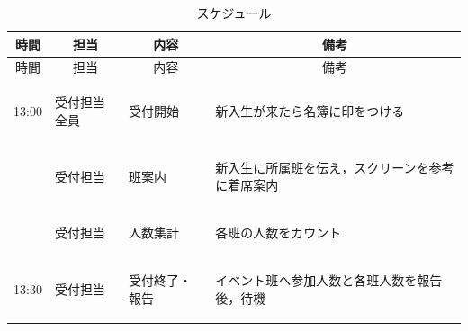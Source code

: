 \begin{longtable}[c]{|p{}|p{}|p{}|p{}|}
  \caption{スケジュール} \\
  \hline
  \multicolumn{1}{|c|}{時間} & \multicolumn{1}{c|}{担当} & \multicolumn{1}{c|}{内容} & \multicolumn{1}{c|}{備考} \\
  \hline
  \endfirsthead

  \hline
  \multicolumn{1}{|c|}{時間} & \multicolumn{1}{c|}{担当} & \multicolumn{1}{c|}{内容} & \multicolumn{1}{c|}{備考} \\
  \hline
  \endhead

  \hline
  \endfoot

  \hline
  \endlastfoot

  \begin{tpacol}
    13:00
  \end{tpacol}&
  \begin{tpbcol}
    受付担当全員
  \end{tpbcol}&
  \begin{tpccol}
    受付開始
  \end{tpccol}&
  \begin{tpdcol}
    新入生が来たら名簿に印をつける
  \end{tpdcol}\\

  \begin{tpacol}

  \end{tpacol}&
  \begin{tpbcol}
    受付担当
  \end{tpbcol}&
  \begin{tpccol}
    班案内
  \end{tpccol}&
  \begin{tpdcol}
    新入生に所属班を伝え，スクリーンを参考に着席案内
  \end{tpdcol}\\

  \begin{tpacol}

  \end{tpacol}&
  \begin{tpbcol}
    受付担当
  \end{tpbcol}&
  \begin{tpccol}
    人数集計
  \end{tpccol}&
  \begin{tpdcol}
    各班の人数をカウント
  \end{tpdcol}\\

  \begin{tpacol}
    13:30
  \end{tpacol}&
  \begin{tpbcol}
    受付担当
  \end{tpbcol}&
  \begin{tpccol}
    受付終了・報告
  \end{tpccol}&
  \begin{tpdcol}
    イベント班へ参加人数と各班人数を報告後，待機
  \end{tpdcol}\\

\end{longtable}

